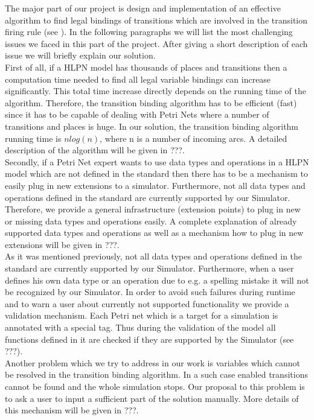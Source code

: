 The major part of our project is design and implementation of an effective algorithm to find legal bindings of transitions which are involved in the transition firing rule (see ). In the following paragraphs we will list the most challenging issues we faced in this part of the project. After giving a short description of each issue we will briefly explain our solution.
\\First of all, if a HLPN model has thousands of places and transitions then a computation time needed to find all legal variable bindings can increase significantly. This total time increase directly depends on the running time of the algorithm. Therefore, the transition binding algorithm has to be efficient (fast) since it has to be capable of dealing with Petri Nets where a number of transitions and places is huge. In our solution, the transition binding algorithm running time is $nlog(n)$, where n is a number of incoming arcs. A detailed description of the algorithm will be given in ???.
\\Secondly, if a Petri Net expert wants to use data types and operations in a HLPN model which are not defined in the standard then there has to be a mechanism to easily plug in new extensions to a simulator. Furthermore, not all data types and operations defined in the standard are currently supported by our Simulator. Therefore, we provide a general infrastructure (extension points) to plug in new or missing data types and operations easily. A complete explanation of already supported data types and operations as well as a mechanism how to plug in new extensions will be given in ???.
\\As it was mentioned previously, not all data types and operations defined in the standard are currently supported by our Simulator. Furthermore, when a user defines his own data type or an operation due to e.g. a spelling mistake it will not be recognized by our Simulator. In order to avoid such failures during runtime and to warn a user about currently not supported functionality we provide a validation mechanism. Each Petri net which is a target for a simulation is annotated with a special tag. Thus during the validation of the model all functions defined in it are checked if they are supported by the Simulator (see ???).
\\Another problem which we try to address in our work is variables which cannot be resolved in the transition binding algorithm. In a such case enabled transitions cannot be found and the whole simulation stops. Our proposal to this problem is to ask a user to input a sufficient part of the solution manually. More details of this mechanism will be given in ???.
